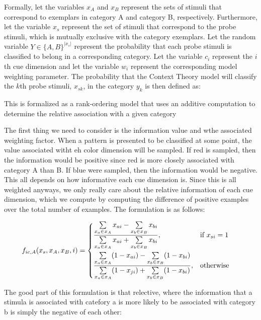 \documentclass{article}
\begin{document}
Formally, let the variables $x_A$ and $x_B$ represent the sets of stimuli that correspond to exemplars in category A and category B, respectively. Furthermore, let the variable $x_s$ represent the set of stimuli that correspond to the probe stimuli, which is mutually exclusive with the category exemplars. Let the random variable $Y \in \{A,B\}^{|x_s|}$ represent the probability that each probe stimuli is classified to belong in a corresponding category. Let the variable $c_i$ represent the $i$th cue dimension and let the variable $w_i$ represent the corresponding model weighting parameter. The probability that the Context Theory model will classify the $k$th probe stimuli, $x_{sk}$, in the category $y_k$ is then defined as:

This is formalized as a rank-ordering model that uses an additive computation to determine the relative association with a given category

The first thing we need to consider is the information value and wthe associated weighting factor. When a pattern is presented to be classified at some point, the value associated witht eh color dimension will be sampled. If red is sampled, then the information would be positive since red is more closely associated with category A than B. If blue were sampled, then the information would be negative. This all depends on how informative each cue dimension is. Since this is all weighted anyways, we only really care about the relative information of each cue dimension, which we compute by computing the difference of positive examples over the total number of examples. The formulation is as follows:

\begin{align}
    f_{ic,A}(x_s, x_A, x_B, i) &= 
        \begin{dcases}
            \frac{\sum\limits_{x_a \in x_A} x_{ai} - \sum\limits_{x_b \in x_B} x_{bi}} {\sum\limits_{x_a \in x_A} x_{ai} + \sum\limits_{x_b \in x_B} x_{bi}}, & \text{if } x_{si} = 1 \\
            \frac{\sum\limits_{x_a \in x_A} (1-x_{ai}) - \sum\limits_{x_b \in x_B} (1-x_{bi})} {\sum\limits_{x_a \in x_A} (1-x_{ji}) + \sum\limits_{x_b \in x_B} (1-x_{bi})}, & \text{otherwise } 
        \end{dcases}
\end{align}

The good part of this formulation is that relective, where the information that a stimula is associated with catefory a is more likely to be associated with category b is simply the negative of each other:
\end{document}

